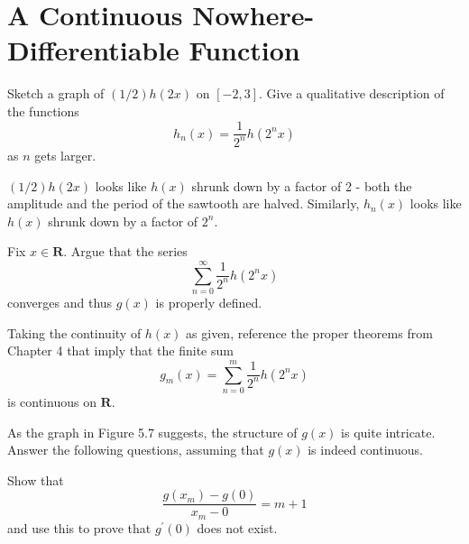 \section{A Continuous Nowhere-Differentiable Function}

\begin{exercise}
    Sketch a graph of \((1/2)h(2x)\) on \([-2,3]\). Give a qualitative description of the functions
    \[h_n(x) = \frac{1}{2^n}h(2^n x)\] as \(n\) gets larger.
\end{exercise}

\begin{solution}
\((1/2)h(2x)\) looks like \(h(x)\) shrunk down by a factor of 2 - both the amplitude and the period of the sawtooth are halved. Similarly, \(h_n(x)\) looks like \(h(x)\) shrunk down by a factor of \(2^n\).
\end{solution}

\begin{exercise}
 Fix $x \in \mathbf{R}$. Argue that the series
\[
\sum_{n=0}^{\infty} \frac{1}{2^{n}} h\left(2^{n} x\right)
\]
converges and thus $g(x)$ is properly defined.

\end{exercise}

\begin{exercise}
Taking the continuity of $h(x)$ as given, reference the proper theorems from Chapter 4 that imply that the finite sum
\[
g_{m}(x)=\sum_{n=0}^{m} \frac{1}{2^{n}} h\left(2^{n} x\right)
\]
is continuous on $\mathbf{R}$.
\end{exercise}

\begin{exercise}
As the graph in Figure 5.7 suggests, the structure of $g(x)$ is quite intricate. Answer the following questions, assuming that $g(x)$ is indeed continuous.
\end{exercise}

\begin{exercise}
Show that
$$
\frac{g\left(x_{m}\right)-g(0)}{x_{m}-0}=m+1
$$
and use this to prove that $g^{\prime}(0)$ does not exist.
\end{exercise}

